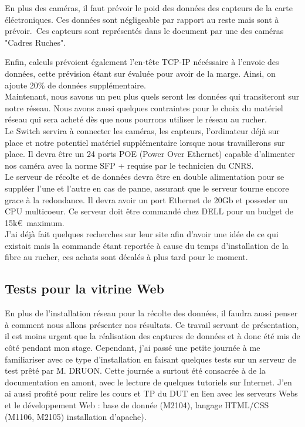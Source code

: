 \documentclass[11pt,french,a4paper]{report}
\begin{document}
En plus des caméras, il faut prévoir le poid des données des capteurs de la carte éléctroniques. Ces données sont négligeable par
rapport au reste mais sont à prévoir. Ces capteurs sont représentés dans le document par une des caméras "Cadres Ruches". 

Enfin, calculs prévoient également l'en-tête TCP-IP nécéssaire à l'envoie des données, cette prévision étant sur évaluée 
pour avoir de la marge. Ainsi, on ajoute 20\% de données supplémentaire.\\

Maintenant, nous savons un peu plus quels seront les données qui transiteront sur notre réseau. Nous avons aussi
quelques contraintes pour le choix du matériel réseau qui sera acheté dès que nous pourrons utiliser le réseau au rucher. \\
Le Switch servira à connecter les caméras, les capteurs, l'ordinateur déjà sur place et notre potentiel matériel supplémentaire
lorsque nous travaillerons sur place. Il devra être un 24 ports POE (Power Over Ethernet) capable 
d'alimenter nos caméra avec la norme SFP + requise par le technicien du CNRS. \\
Le serveur de récolte et de données devra être en double alimentation pour se suppléer l'une et l'autre en cas de panne,
assurant que le serveur tourne encore grace à la redondance. Il devra avoir un port Ethernet de 20Gb et posseder un CPU multicoeur.
Ce serveur doit être commandé chez DELL pour un budget de 15k€ maximum. \\
J'ai déjà fait quelques recherches sur leur site afin d'avoir une idée de ce qui existait mais la commande étant reportée à cause
du temps d'installation de la fibre au rucher, ces achats sont décalés à plus tard pour le moment.\\ 



        \subsection{Tests pour la vitrine Web}
En plus de l'installation réseau pour la récolte des données, il faudra aussi penser à comment nous allons présenter nos 
résultats. Ce travail servant de présentation, il est moins urgent que la réalisation des captures de données et à donc été mis de 
côté pendant mon stage. Cependant, j'ai passé une petite journée à me familiariser avec ce type d'installation en faisant 
quelques tests sur un serveur de test prêté par M. DRUON. Cette journée a surtout été consacrée à de la documentation en amont,
avec le lecture de quelques tutoriels sur Internet. J'en ai aussi profité pour relire les cours et 
TP du DUT en lien avec les serveurs Webs et le développement Web : base de donnée (M2104), langage HTML/CSS (M1106, M2105)
installation d'apache). 
\end{document}

